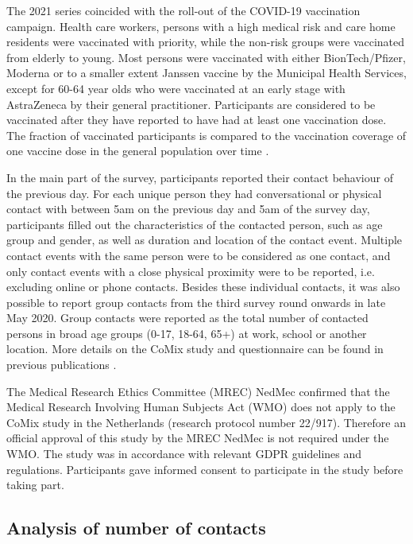 \documentclass[fleqn,10pt]{wlscirep}
\begin{document}
The 2021 series coincided with the roll-out of the COVID-19 vaccination campaign. Health care workers, persons with a high medical risk and care home residents were vaccinated with priority, while the non-risk groups were vaccinated from elderly to young. Most persons were vaccinated with either BionTech/Pfizer, Moderna or to a smaller extent Janssen vaccine by the Municipal Health Services, except for 60-64 year olds who were vaccinated at an early stage with AstraZeneca by their general practitioner. Participants are considered to be vaccinated after they have reported to have had at least one vaccination dose. The fraction of vaccinated participants is compared to the vaccination coverage of one vaccine dose in the general population over time \cite{RIVM_2022}. 

In the main part of the survey, participants reported their contact behaviour of the previous day. For each unique person they had conversational or physical contact with between 5am on the previous day and 5am of the survey day, participants filled out the characteristics of the contacted person, such as age group and gender, as well as duration and location of the contact event. Multiple contact events with the same person were to be considered as one contact, and only contact events with a close physical proximity were to be reported, i.e. excluding online or phone contacts. Besides these individual contacts, it was also possible to report group contacts from the third survey round onwards in late May 2020. Group contacts were reported as the total number of contacted persons in broad age groups (0-17, 18-64, 65+) at work, school or another location. More details on the CoMix study and questionnaire can be found in previous publications \cite{Jarvis_2020, Verelst_2021, Gimma_2022}.

The Medical Research Ethics Committee (MREC) NedMec confirmed that the Medical Research Involving Human Subjects Act (WMO) does not apply to the CoMix study in the Netherlands (research protocol number 22/917). Therefore an official approval of this study by the MREC NedMec is not required under the WMO. The study was in accordance with relevant GDPR guidelines and regulations. Participants gave informed consent to participate in the study before taking part.

\subsection*{Analysis of number of contacts}
\end{document}
